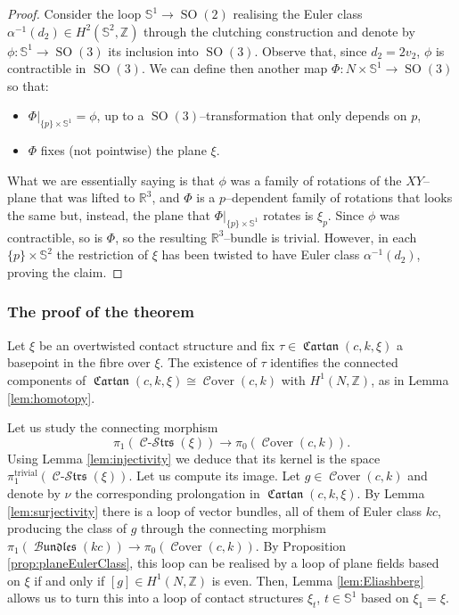 \documentclass[10pt]{amsart}
\newcommand{\SO}{\operatorname{SO}}
\newcommand{\Cover}{\operatorname{\mathcal{C}over}}
\newcommand{\trivial}{{\operatorname{trivial}}}
\newcommand{\Cartan}{\operatorname{\mathfrak{Cartan}}}
\newcommand{\Cont}{\operatorname{\mathcal{C}-\mathcal{S}\mathfrak{trs}}}
\newcommand{\Bundles}{\operatorname{\mathcal{B}\mathfrak{undles}}}
\newcommand{\R}{{\mathbb{R}}}
\newcommand{\Z}{{\mathbb{Z}}}
\newcommand{\NS}{{\mathbb{S}}}
\theoremstyle{definition}
\begin{document}
\begin{proof}
Consider the loop $\NS^1 \to \SO(2)$ realising the Euler class $\alpha^{-1}(d_2) \in H^2(\NS^2,\Z)$ through the clutching construction and denote by $\phi: \NS^1 \to \SO(3)$ its inclusion into $\SO(3)$. Observe that, since $d_2=2v_2$, $\phi$ is contractible in $\SO(3)$. We can define then another map $\Phi: N \times \NS^1 \to \SO(3)$ so that:
\begin{itemize}
\item $\Phi|_{\{p\} \times \NS^1} = \phi$, up to a $\SO(3)$--transformation that only depends on $p$,
\item $\Phi$ fixes (not pointwise) the plane $\xi$.
\end{itemize}
What we are essentially saying is that $\phi$ was a family of rotations of the $XY$--plane that was lifted to $\R^3$, and $\Phi$ is a $p$--dependent family of rotations that looks the same but, instead, the plane that $\Phi|_{\{p\} \times \NS^1}$ rotates is $\xi_p$. Since $\phi$ was contractible, so is $\Phi$, so the resulting $\R^3$--bundle is trivial. However, in each $\{p\} \times \NS^2$ the restriction of $\xi$ has been twisted to have Euler class $\alpha^{-1}(d_2)$, proving the claim. 
\end{proof}


\subsubsection{The proof of the theorem} \label{ssec:nonTrivialContact}

Let $\xi$ be an overtwisted contact structure and fix $\tau \in \Cartan(c,k,\xi)$ a basepoint in the fibre over $\xi$. The existence of $\tau$ identifies the connected components of $\Cartan(c,k,\xi) \cong\Cover(c,k)$ with $H^1(N,\Z)$, as in Lemma \ref{lem:homotopy}.

Let us study the connecting morphism 
\[ \pi_1(\Cont(\xi)) \to \pi_0(\Cover(c,k)). \]
Using Lemma \ref{lem:injectivity} we deduce that its kernel is the space $\pi_1^\trivial(\Cont(\xi))$. Let us compute its image. Let $g \in \Cover(c,k)$ and denote by $\nu$ the corresponding prolongation in $\Cartan(c,k,\xi)$. By Lemma \ref{lem:surjectivity} there is a loop of vector bundles, all of them of Euler class $kc$, producing the class of $g$ through the connecting morphism $\pi_1(\Bundles(kc)) \to \pi_0(\Cover(c,k))$. By Proposition \ref{prop:planeEulerClass}, this loop can be realised by a loop of plane fields based on $\xi$ if and only if $[g] \in H^1(N,\Z)$ is even. Then, Lemma \ref{lem:Eliashberg} allows us to turn this into a loop of contact structures $\xi_t$, $t \in \NS^1$ based on $\xi_1 = \xi$. 
\end{document}
